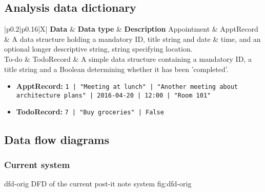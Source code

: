 \subsection{Analysis data dictionary}

\newcommand{\dictline}[1]{#1 \\ \hline}
\begin{table}[H]
    \centering
    \begin{tabularx}{\linewidth}{|p{0.2\linewidth}|p{0.16\linewidth}|X|} \hline
        \textbf{Data} & \textbf{Data type} &
        \textbf{Description} \R
        \dictline{Appointment & ApptRecord
          & A data structure holding a mandatory ID, title string and date \&
          time, and an optional longer descriptive string, string specifying
          location.}
        \dictline{To-do & TodoRecord
          & A simple data structure containing a mandatory ID, a title string
          and a Boolean determining whether it has been 'completed'.}
    \end{tabularx}
    \caption{The analysis data dictionary.}
    \label{tbl:add}
\end{table}

\begin{itemize}
    \item \textbf{ApptRecord:}
    \texttt{1 | "Meeting at lunch" | "Another meeting about architecture plans"
    | 2016-04-20 | 12:00 | "Room 101"}
    \item \textbf{TodoRecord:}
    \texttt{7 | "Buy groceries" | False}
\end{itemize}

\subsection{Data flow diagrams}
\subsubsection{Current system}

\addfigure
    {dfd-orig}
    {DFD of the current post-it note system}
    {fig:dfd-orig}

